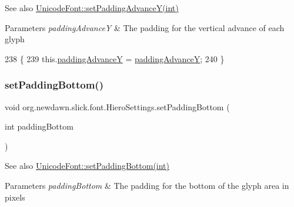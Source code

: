 \begin{DoxySeeAlso}{See also}
\mbox{\hyperlink{classorg_1_1newdawn_1_1slick_1_1_unicode_font_ad10b4bc614f7e2b66e650726918940b2}{Unicode\+Font\+::set\+Padding\+Advance\+Y(int)}}
\end{DoxySeeAlso}

\begin{DoxyParams}{Parameters}
{\em padding\+AdvanceY} & The padding for the vertical advance of each glyph \\
\hline
\end{DoxyParams}

\begin{DoxyCode}
238                                                         \{
239         this.\mbox{\hyperlink{classorg_1_1newdawn_1_1slick_1_1font_1_1_hiero_settings_a9ebcbca5bb87465cbb18bbc40b1bb09e}{paddingAdvanceY}} = \mbox{\hyperlink{classorg_1_1newdawn_1_1slick_1_1font_1_1_hiero_settings_a9ebcbca5bb87465cbb18bbc40b1bb09e}{paddingAdvanceY}};
240     \}
\end{DoxyCode}
\mbox{\label{classorg_1_1newdawn_1_1slick_1_1font_1_1_hiero_settings_a0f14e4e7880ac7e4ea87215de3f4d18b}} 
\subsubsection{\texorpdfstring{set\+Padding\+Bottom()}{setPaddingBottom()}}
{\footnotesize\ttfamily void org.\+newdawn.\+slick.\+font.\+Hiero\+Settings.\+set\+Padding\+Bottom (\begin{DoxyParamCaption}\item[{int}]{padding\+Bottom }\end{DoxyParamCaption})\hspace{0.3cm}{\ttfamily [inline]}}

\begin{DoxySeeAlso}{See also}
\mbox{\hyperlink{classorg_1_1newdawn_1_1slick_1_1_unicode_font_aac0bf22d918803bfd351a6b06aac7f5e}{Unicode\+Font\+::set\+Padding\+Bottom(int)}}
\end{DoxySeeAlso}

\begin{DoxyParams}{Parameters}
{\em padding\+Bottom} & The padding for the bottom of the glyph area in pixels \\
\hline
\end{DoxyParams}

